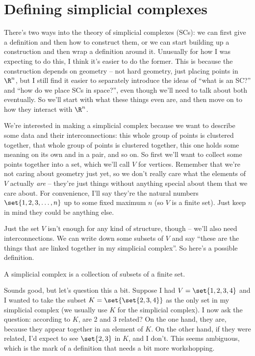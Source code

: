\documentclass{lec}
\begin{document}
    \section{Defining simplicial complexes}

    There's two ways into the theory of simplicial complexes (SCs): we can first give a definition and then how to construct them, or we can start building up a construction and then wrap a definition around it. Unusually for how I was expecting to do this, I think it's easier to do the former. This is because the construction depends on geometry -- not hard geometry, just placing points in $\R^n$, but I still find it easier to separately introduce the ideas of ``what is an SC?'' and ``how do we place SCs in space?'', even though we'll need to talk about both eventually. So we'll start with what these things even are, and then move on to how they interact with $\R^n$.

    We're interested in making a simplicial complex because we want to describe some data and their interconnections: this whole group of points is clustered together, that whole group of points is clustered together, this one holds some meaning on its own and in a pair, and so on. So first we'll want to collect some points together into a set, which we'll call $V$ for vertices. Remember that we're not caring about geometry just yet, so we don't really care what the elements of $V$ actually \textit{are} -- they're just things without anything special about them that we care about. For convenience, I'll say they're the natural numbers $\set{1, 2, 3, \dots, n}$ up to some fixed maximum $n$ (so $V$ is a finite set). Just keep in mind they could be anything else.

    Just the set $V$ isn't enough for any kind of structure, though -- we'll also need interconnections. We can write down some subsets of $V$ and say ``these are the things that are linked together in my simplicial complex''. So here's a possible definition.

    \begin{wipdefinition}
        A simplicial complex is a collection of subsets of a finite set.
    \end{wipdefinition}

    Sounds good, but let's question this a bit. Suppose I had $V = \set{1, 2, 3, 4}$ and I wanted to take the subset $K = \set{\set{2, 3, 4}}$ as the only set in my simplicial complex (we usually use $K$ for the simplicial complex). I now ask the question: according to $K$, are 2 and 3 related? On the one hand, they are, because they appear together in an element of $K$. On the other hand, if they were related, I'd expect to see $\set{2, 3}$ in $K$, and I don't. This seems ambiguous, which is the mark of a definition that needs a bit more workshopping.
\end{document}
